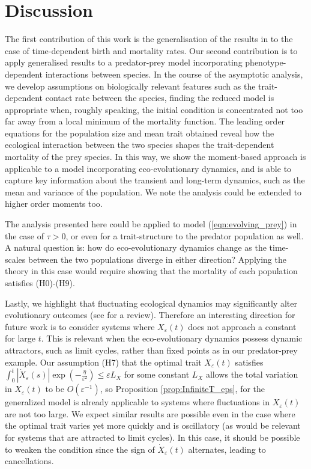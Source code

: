 \documentclass[]{article}
\theoremstyle{remark}
\begin{document}
\section{Discussion}\label{sec:Conclusion}
The first contribution of this work is the generalisation of the results in \cite{GHM} to the case of time-dependent birth and mortality rates. Our second contribution is to apply generalised results to a predator-prey model incorporating phenotype-dependent interactions between species. In the course of the asymptotic analysis, we develop assumptions on biologically relevant features such as the trait-dependent contact rate between the species, finding the reduced model is appropriate when, roughly speaking, the initial condition is concentrated not too far away from a local minimum of the mortality function. The leading order equations for the population size and mean trait obtained reveal how the ecological interaction between the two species shapes the trait-dependent mortality of the prey species. In this way, we show the moment-based approach is applicable to a model incorporating eco-evolutionary dynamics, and is able to capture key information about the transient and long-term dynamics, such as the mean and variance of the population. We note the analysis could be extended to higher order moments too. 

The analysis presented here could be applied  to model (\ref{eqn:evolving_prey}) in the case of $\tau>0$, or even for a trait-structure to the predator population as well. A natural question is: how do eco-evolutionary dynamics change as the time-scales between the two populations diverge in either direction? Applying the theory in this case would require showing that the mortality of each population satisfies (H0)-(H9).

Lastly, we highlight that fluctuating ecological dynamics may significantly alter evolutionary outcomes (see \cite{best2023fluctuating} for a review). Therefore an interesting direction for future work is to consider systems where $X_\varepsilon(t)$ does not approach a constant for large $t$. This is relevant when the eco-evolutionary dynamics possess dynamic attractors, such as limit cycles, rather than fixed points as in our predator-prey example. Our assumption (H7) that the optimal trait $X_\varepsilon(t)$ satisfies $\int_{0}^{t}|\dot{X}_\varepsilon(s)|\exp\left(-\frac{\eta}{\varepsilon^2}\right)\leq{}\varepsilon{}L_X$ for some constant $L_X$  allows the total variation in $X_\varepsilon(t)$ to be $O(\varepsilon^{-1})$, so Proposition \ref{prop:InfiniteT_eps}, for the generalized model is already applicable to systems where fluctuations in $X_\varepsilon(t)$ are not too large. We expect similar results are possible even in the case where the optimal trait varies yet more quickly and is oscillatory (as would be relevant for systems that are attracted to limit cycles). In this case, it should be possible to weaken the condition since the sign of $\dot{X}_\varepsilon(t)$ alternates, leading to cancellations.
\end{document}
